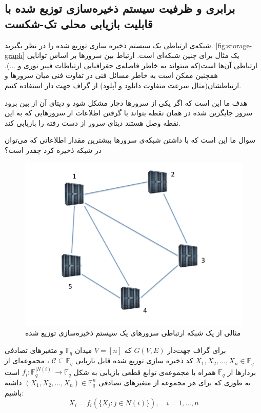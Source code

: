  \subsection{
 برابری 
 \icod
  و ظرفیت سیستم ذخیره‌سازی توزیع شده با قابلیت بازیابی محلی تک-شکست
 }
 شبکه‌ی ارتباطی یک سیستم ذخیره سازی توزیع شده را در نظر بگیرید.
 \autoref{fig:storage-graph}
 یک مثال برای چنین شبکه‌ای است. ارتباط بین سرورها بر اساس توانایی ارتباطی آن‌ها است(که میتواند به خاطر فاصله‌ی جغرافیایی ارتباطات فیبر نوری و ...). همچنین ممکن است به خاطر مسائل فنی در تفاوت فنی میان سرورها و ارتباطشان(مثال سرعت متفاوت دانلود و آپلود) از گراف جهت دار استفاده کنیم.
 
 هدف ما این است که اگر یکی از سرورها دچار مشکل شود و دیتای آن از بین برود سرور جایگزین شده در همان نقطه بتواند با گرفتن اطلاعات از سرورهایی که به این نقطه وصل هستند دیتای سرور از دست رفته را بازیابی کند.
 
 سوال ما این است که با داشتن شبکه‌ی سرورها بیشترین مقدار اطلاعاتی که می‌توان در شبکه ذخیره کرد چقدر است؟
\begin{figure}[H]
	\centering
	\includegraphics[width=0.5\linewidth]{figs/chapter6/storage-graph}
	\caption{
		مثالی از یک شبکه ارتباطی سرورهای یک سیستم ذخیره‌سازی توزیع شده
		\cite{arya}
		}
	\label{fig:storage-graph}
\end{figure}

\begin{definition}
	برای گراف جهت‌دار
	$G(V, E)$
	که
	$V = [n]$
	میدان
	$\mathbb{F}_{q}$
	و متغیرهای تصادفی
	$X_1, X_2, \ldots, X_n \in \mathbb{F}_{q}$
		کد ذخیره سازی توزیع شده قابل بازیابی 
		$\mathcal{C} \subseteq \mathbb{F}_{q}$
		،  مجموعه‌ای از بردار‌ها از
		$\mathbb{F}_{q}$
		همراه با مجموعه‌ی توابع قطعی بازیابی به شکل
		$f_i: \mathbb{F}_q^{|N(i)|} \to \mathbb{F}_q$
		است به طوری که برای هر مجموعه از متغیرهای تصادفی 
		$(X_1, X_2,\dots,X_n) \in \mathbb{F}_q^n$
		داشته باشیم:
		$$X_i = f_i(\{X_j: j \in N(i)\}), \quad i = 1,\dots,n$$
\end{definition}

